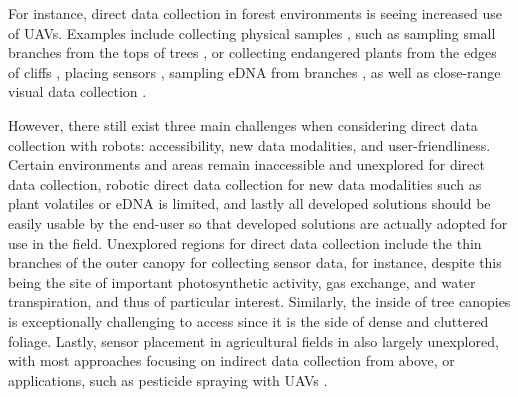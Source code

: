 For instance, direct data collection in forest environments is seeing increased use of UAVs.
Examples include collecting physical samples \cite{Krasylenko2023}, such as sampling small branches from the tops of trees \cite{Charron2020}, or collecting endangered plants from the edges of cliffs \cite{LaVigne2022}, placing sensors \cite{Hamaza2020, Farinha2020}, sampling eDNA from branches \cite{Aucone2023a}, as well as close-range visual data collection \cite{Liu2022, Zhou2022}.

However, there still exist three main challenges when considering direct data collection with robots: accessibility, new data modalities, and user-friendliness.
Certain environments and areas remain inaccessible and unexplored for direct data collection, robotic direct data collection for new data modalities such as plant volatiles or eDNA is limited, and lastly all developed solutions should be easily usable by the end-user so that developed solutions are actually adopted for use in the field.
Unexplored regions for direct data collection include the thin branches of the outer canopy for collecting sensor data, for instance, despite this being the site of important photosynthetic activity, gas exchange, and water transpiration, and thus of particular interest. 
Similarly, the inside of tree canopies is exceptionally challenging to access since it is the side of dense and cluttered foliage.  %
Lastly, sensor placement in agricultural fields in also largely unexplored, with most approaches focusing on indirect data collection from above, or applications, such as pesticide spraying with UAVs \cite{}.
